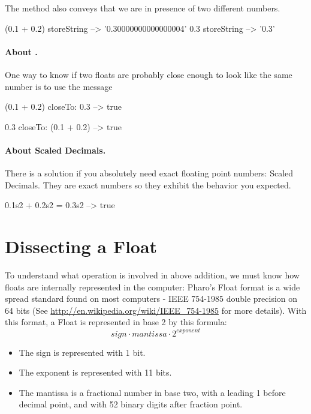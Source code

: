 \documentclass[a4paper,10pt,twoside]{book}
\begin{document}
	
The method  also conveys that we are in presence of two different numbers.
		
\begin{code}{}
(0.1 + 0.2) storeString 
	--> 	'0.30000000000000004' 
0.3 storeString 
	-->	'0.3'
\end{code}	
		
\paragraph{About .} One way to know if two floats are probably close enough to look like the same number is to use the message 

\begin{code}{}
(0.1 + 0.2) closeTo: 0.3
	--> true

0.3 closeTo: (0.1 + 0.2)
	--> true
\end{code}		
		
		
\paragraph{About Scaled Decimals.} There is a solution if you absolutely need exact floating point numbers: Scaled Decimals. They are exact numbers so they exhibit the behavior you expected.

\begin{code}{}
0.1s2 + 0.2s2 = 0.3s2
	--> true
\end{code}		
		



\section{Dissecting a Float}
To understand what operation is involved in above addition, we must know how floats are internally represented in the computer: Pharo's Float format is a wide spread standard found on most computers - IEEE 754-1985 double precision on 64 bits
(See \url{http://en.wikipedia.org/wiki/IEEE_754-1985} for more details).
With this format, a Float is represented in base 2 by this formula: \[ sign \cdot mantissa \cdot 2^{exponent} \]
\begin{itemize}
\item The sign is represented with 1 bit.
\item The exponent is represented with 11 bits.
\item The mantissa is a fractional number in base two, with a leading 1 before decimal point, and with 52 binary digits after fraction point.
\end{itemize}
\end{document}
